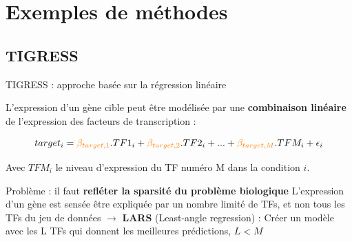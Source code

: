 \section{Exemples de méthodes}

\subsection{TIGRESS}
	
\begin{frame}{TIGRESS : approche basée sur la régression linéaire}

L'expression d'un gène cible peut être modélisée par une \textbf{combinaison linéaire} de l'expression des facteurs de transcription :
    
    \begin{equation*}
    	   target_i = \textcolor{orange}{\beta_{target,1}}.TF1_i + \textcolor{orange}{\beta_{target,2}}.TF2_i + ... + \textcolor{orange}{\beta_{target,M}}.TFM_i  + \epsilon_i
    \end{equation*}
    
Avec $TFM_i$ le niveau d'expression du TF numéro M dans la condition $i$.
\vspace{0.3cm}


\begin{alertblock}{\small Problème : il faut \textbf{refléter la sparsité du problème biologique}}
\small L'expression d'un gène est sensée être expliquée par un nombre limité de TFs, et non tous les TFs du jeu de données $\rightarrow$ \textbf{LARS} (Least-angle regression) :
Créer un modèle avec les L TFs qui donnent les meilleures prédictions, $L<M$
\end{alertblock}

\end{frame}






